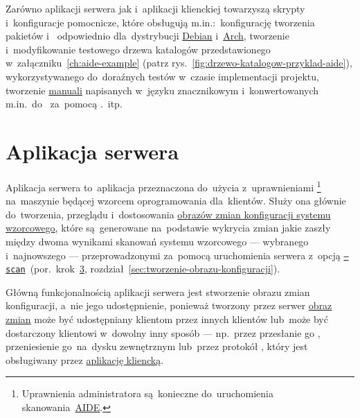 \documentclass[thesis]{subfiles}
\begin{document}
Zarówno aplikacji serwera jak i~aplikacji klienckiej towarzyszą skrypty i~konfiguracje pomocnicze, które obsługują m.in.:~konfigurację tworzenia pakietów  i~ odpowiednio dla~dystrybucji  \href{https://en.wikipedia.org/wiki/Debian}{Debian} i~\href{https://en.wikipedia.org/wiki/Arch_Linux}{Arch}, tworzenie i~modyfikowanie testowego drzewa katalogów przedstawionego w~załączniku~\ref{ch:aide-example} (patrz rys.~\ref{fig:drzewo-katalogow-przyklad-aide}), wykorzystywanego do~doraźnych testów w~czasie implementacji projektu, tworzenie \href{https://en.wikipedia.org/wiki/User_guide}{manuali} napisanych w~języku znacznikowym  i~konwertowanych m.in.~do~ za~pomocą .~itp.


\section{Aplikacja serwera}
\label{sec:srv-app}

Aplikacja serwera to~aplikacja przeznaczona do~użycia z~uprawnieniami \footnote{Uprawnienia administratora są~konieczne do~uruchomienia skanowania~\hyperref[sec:aide]{AIDE}.} na~maszynie będącej wzorcem oprogramowania dla~klientów. Służy ona głównie do~tworzenia, przeglądu i~dostosowania \hyperref[sec:obraz-zmian-konfiguracji]{obrazów zmian konfiguracji systemu wzorcowego}, które są~generowane na~podstawie wykrycia zmian jakie zaszły między dwoma wynikami skanowań systemu wzorcowego --- wybranego i~najnowszego --- przeprowadzonymi za~pomocą uruchomienia serwera z~opcją \hyperlink{itm:srv-scan}{\texttt{--scan}}~(por.~krok~\hyperlink{itm:stworzenie-obrazu-konfiguracji}{3}, rozdział~\ref{sec:tworzenie-obrazu-konfiguracji}).

Główną funkcjonalnością aplikacji serwera jest stworzenie obrazu zmian konfiguracji, a~nie jego udostępnienie, ponieważ tworzony przez serwer \hyperref[sec:obraz-zmian-konfiguracji]{obraz zmian} może być udostępniany klientom przez innych klientów lub~może być dostarczony klientowi w~dowolny inny sposób --- np.~przez przesłanie go , przeniesienie go~na~dysku zewnętrznym lub~przez protokół \sftp{}, który jest obsługiwany przez \hyperref[sec:cli-app]{aplikację kliencką}.
\end{document}
